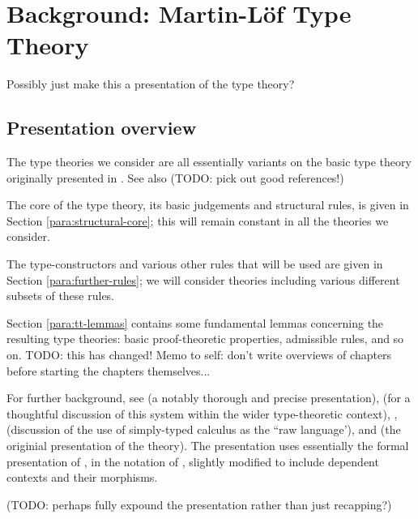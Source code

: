 
\chapter{Background: Martin-L\"o{}f Type Theory}

Possibly just make this a presentation of the type theory?

\section{Presentation overview}

\para The type theories we consider are all essentially variants on the basic type theory originally presented in \cite{ML:predicative-part}.  See also (TODO: pick out good references!)

The core of the type theory, its basic judgements and structural rules, is given in Section \ref{para:structural-core}; this will remain constant in all the theories we consider.

The type-constructors and various other rules that will be used are given in Section \ref{para:further-rules}; we will consider theories including various different subsets of these rules.

Section \ref{para:tt-lemmas} contains some fundamental lemmas concerning the resulting type theories: basic proof-theoretic properties, admissible rules, and so on.  TODO: this has changed!  Memo to self: don't write overviews of chapters before starting the chapters themselves...

For further background, see \cite{pitts:categorical-logic} (a notably thorough and precise presentation), \cite[\S6]{jacobs:categorical-logic} (for a thoughtful discussion of this system within the wider type-theoretic context), \cite{hofmann:syntax-and-semantics}, \cite[Ch.3]{n-p-s:programming} (discussion of the use of simply-typed calculus as the ``raw language'), and \cite{martin-loef:predicative-part} (the originial presentation of the theory).  The presentation uses essentially the formal presentation of \cite{pitts:categorical-logic}, in the notation of \cite{jacobs:categorical-logic}, slightly modified to include dependent contexts and their morphisms. 

(TODO: perhaps fully expound the presentation rather than just recapping?)

